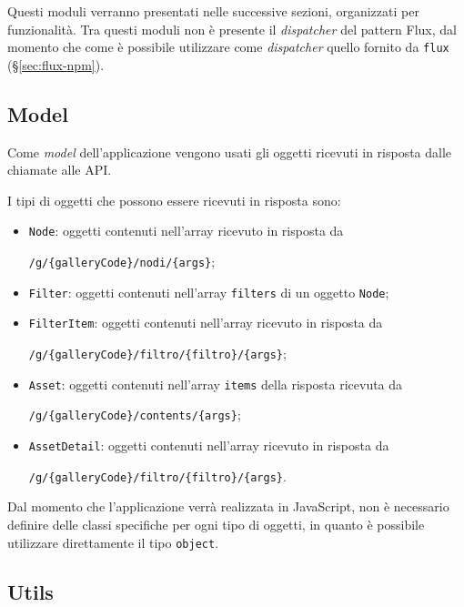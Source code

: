 Questi moduli verranno presentati nelle successive sezioni, organizzati per funzionalità.
Tra questi moduli non è presente il \textit{dispatcher} del pattern Flux, dal momento che come è possibile utilizzare come \textit{dispatcher} quello fornito da \texttt{flux} (§\ref{sec:flux-npm}).

\subsection{Model}

Come \textit{model} dell'applicazione vengono usati gli oggetti ricevuti in risposta dalle chiamate alle API.

I tipi di oggetti che possono essere ricevuti in risposta sono:
\begin{itemize}
\item \texttt{Node}: oggetti contenuti nell'array ricevuto in risposta da \begin{center}
\texttt{/g/\{galleryCode\}/nodi/\{args\}};
\end{center} 
\item \texttt{Filter}: oggetti contenuti nell'array \texttt{filters} di un oggetto \texttt{Node};
\item \texttt{FilterItem}: oggetti contenuti nell'array ricevuto in risposta da 
\begin{center}
\texttt{/g/\{galleryCode\}/filtro/\{filtro\}/\{args\}};
\end{center}
\item \texttt{Asset}: oggetti contenuti nell'array \texttt{items} della risposta ricevuta da 
\begin{center}
\texttt{/g/\{galleryCode\}/contents/\{args\}};
\end{center}
\item \texttt{AssetDetail}: oggetti contenuti nell'array ricevuto in risposta da
\begin{center}
\texttt{/g/\{galleryCode\}/filtro/\{filtro\}/\{args\}}.
\end{center}
\end{itemize}

Dal momento che l'applicazione verrà realizzata in JavaScript, non è necessario definire delle classi specifiche per ogni tipo di oggetti, in quanto è possibile utilizzare direttamente il tipo \texttt{object}.

\subsection{Utils}


